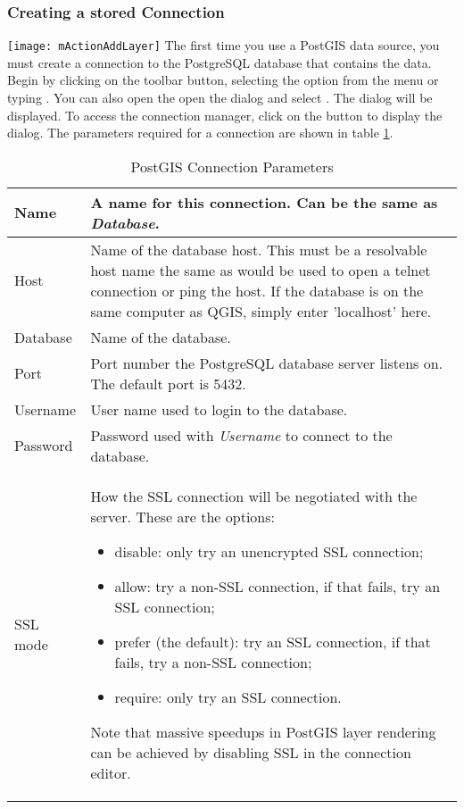 \subsubsection{Creating a stored
Connection}\label{sec:postgis_stored}

\texttt{[image: mActionAddLayer]} The first time
you use a PostGIS data source, you must create a connection to the PostgreSQL
database that contains the data. Begin by clicking on the
 toolbar button, selecting the
 option from the  menu or typing
. You can also open the open the 
 dialog and select .
The  dialog will
be displayed. To access the connection manager, click on the  button to display the  dialog. The parameters required for a connection are shown
in table \ref{tab:postgis_connection_parms}.

\begin{table}[ht]
\centering
\caption{PostGIS Connection
Parameters}\label{tab:postgis_connection_parms}\medskip
 \begin{tabular}{|l|p{5in}|}
\hline Name & A name for this connection. Can be the same as \textsl{Database}.
\\
\hline Host \index{PostgreSQL!host}
& Name of the database host. This must be a resolvable host name the same as
would be used to open a telnet connection or ping the host. If the database is 
on the same computer as QGIS, simply enter 'localhost' here. \\
\hline Database \index{PostgreSQL!database} & Name of the database.  \\
\hline Port \index{PostgreSQL!port}& Port number the PostgreSQL database
server listens on. The default port is 5432.\\
\hline Username \index{PostgreSQL!username}& User name used to login to the
database. \\
\hline Password \index{PostgreSQL!password}& Password used with
\textsl{Username} to connect to the database.\\
\hline SSL mode \index{PostgreSQL!sslmode}& How the SSL connection will be negotiated with the server. These are the options: 
\begin {itemize}
\item disable: only try an unencrypted SSL connection;
\item allow: try a non-SSL connection, if that fails, try an SSL connection;
\item prefer (the default): try an SSL connection, if that fails, try a non-SSL connection;
\item require: only try an SSL connection.
\end {itemize}
Note that massive speedups in PostGIS layer rendering can be achieved by disabling SSL in the connection editor. \\
\hline
\end{tabular}
\end{table}

